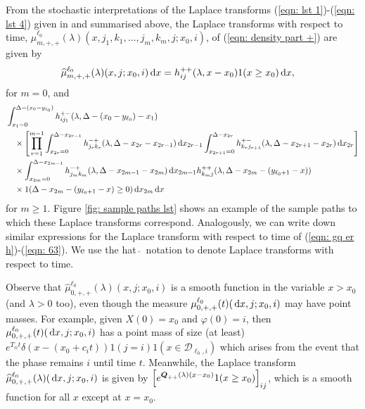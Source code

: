 From the stochastic interpretations of the Laplace transforms (\ref{eqn: lst 1})-(\ref{eqn: lst 4}) given in \cite{bean2005} and summarised above, the Laplace transforms with respect to time, \(\widehat \mu^{\ell_0}_{m,+,+}(\lambda)( x, j_1,k_1,\dots,j_m,k_m, j; x_0,i)\), of (\ref{eqn: density part +}) are given by 
\begin{align*}
	\widehat \mu^{\ell_0}_{m,+,+}(\lambda)( x,j;x_0,i) \, \mathrm{d} x&= h_{ij}^{++}(\lambda,x-x_0)1(x\geq x_0)\, \mathrm{d} x,
\end{align*}
for \(m=0\),  and 
\begin{align}
	\nonumber&\int_{x_1 = 0}^{\Delta-(x_0-y_{\ell_0})} h_{ij_1}^{+-}(\lambda,\Delta-(x_0-y_{\ell_0})-x_1)  %
	\\& \quad \nonumber\times\left[\prod_{r=1}^{m-1} \int_{x_{2r}=0}^{\Delta-x_{2r-1}} h_{j_rk_r}^{-+}(\lambda,\Delta-x_{2r}-x_{2r-1})\wrt x_{2r-1}\int_{x_{2r+1}=0}^{\Delta-x_{2r}}h_{k_{r}j_{r+1}}^{+-}(\lambda,\Delta-x_{2r+1}-x_{2r})\wrt x_{2r}\right]
	\\&\quad\times \int_{x_{2m}=0}^{\Delta-x_{2m-1}} h_{j_{m}k_{m}}^{-+}(\lambda,\Delta -x_{2m-1} - x_{2m}) \wrt x_{2m-1}h_{k_mj}^{++}(\lambda,\Delta -x_{2m}- (y_{\ell_0+1}- x))\nonumber	
	\\&\quad\times 1(\Delta-x_{2m}-(y_{\ell_0+1}-x)\geq 0)\wrt x_{2m} \wrt x \label{eqn: lst herwe}
\end{align} 
for \(m\geq 1\). Figure \ref{fig: sample paths lst} shows an example of the sample paths to which these Laplace transforms correspond.  Analogously, we can write down similar expressions for the Laplace transform with respect to time of (\ref{eqn: gq er h})-(\ref{eqn: 63}). We use the hat \(\,\widehat{}\,\)  notation to denote Laplace transforms with respect to time. 

Observe that \(\widehat \mu^{\ell_0}_{0,+,+}(\lambda)(x,j;x_0,i)\) is a smooth function in the variable \(x> x_0\) (and \(\lambda>0\) too), even though the measure \(\mu^{\ell_0}_{0,+,+}(t)(\, \mathrm{d} x,j;x_0,i)\) may have point masses. For example, given \(X(0)=x_0\) and \(\varphi(0)=i\), then \(\mu^{\ell_0}_{0,+,+}(t)(\, \mathrm{d} x,j;x_0,i)\) has a point mass of size (at least) \(e^{T_{ii}t}\delta(x-(x_0+c_it))1(j=i)1(x\in\mathcal D_{\ell_0,i})\) which arises from the event that the phase remains \(i\) until time \(t\). Meanwhile, the Laplace transform \(\widehat \mu^{\ell_0}_{0,+,+}(\lambda)(\, \mathrm{d} x,j;x_0,i)\) is given by \(\displaystyle \left[e^{\boldsymbol Q_{++}(\lambda)(x-x_0)}1(x\geq x_0)\right]_{ij}\), which is a smooth function for all \(x\) except at \(x=x_0\). 

